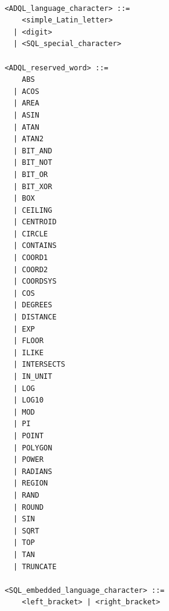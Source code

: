 \documentclass[11pt,a4paper]{ivoa}
\begin{document}
\begin{verbatim}

    <ADQL_language_character> ::=
        <simple_Latin_letter>
      | <digit>
      | <SQL_special_character>

    <ADQL_reserved_word> ::=
        ABS
      | ACOS
      | AREA
      | ASIN
      | ATAN
      | ATAN2
      | BIT_AND
      | BIT_NOT
      | BIT_OR
      | BIT_XOR
      | BOX
      | CEILING
      | CENTROID
      | CIRCLE
      | CONTAINS
      | COORD1
      | COORD2
      | COORDSYS
      | COS
      | DEGREES
      | DISTANCE
      | EXP
      | FLOOR
      | ILIKE
      | INTERSECTS
      | IN_UNIT
      | LOG
      | LOG10
      | MOD
      | PI
      | POINT
      | POLYGON
      | POWER
      | RADIANS
      | REGION
      | RAND
      | ROUND
      | SIN
      | SQRT
      | TOP
      | TAN
      | TRUNCATE

    <SQL_embedded_language_character> ::=
        <left_bracket> | <right_bracket>


\end{verbatim}
\end{document}
